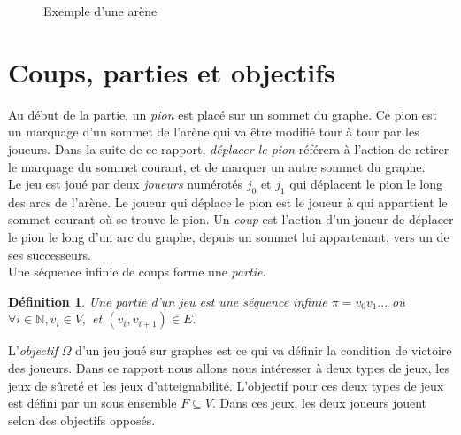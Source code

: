 \documentclass[12pt,a4paper,oneside,titlepage]{report}
\newtheorem{defi}{D\'efinition}[section]
\begin{document}
\begin{figure}[h]
\centering
{}
\caption{Exemple d'une arène}
\label{fig:arena}
\end{figure}
\section{Coups, parties et objectifs}
Au début de la partie, un \emph{pion} est placé sur un sommet du graphe. Ce pion est un marquage d'un sommet de l'arène qui va être modifié tour à tour par les joueurs. Dans la suite de ce rapport, \emph{déplacer le pion} référera à l'action de retirer le marquage du sommet courant, et de marquer un autre sommet du graphe.\\
Le jeu est joué par deux \emph{joueurs} numérotés $j_0$ et $j_1$ qui déplacent le pion le long des arcs de l'arène. Le joueur qui déplace le pion est le joueur à qui appartient le sommet courant où se trouve le pion. Un \emph{coup} est l'action d'un joueur de déplacer le pion le long d'un arc du graphe, depuis un sommet lui appartenant, vers un de ses successeurs.\\
Une séquence infinie de coups forme une \emph{partie}.
\begin{defi}
	Une \emph{partie} d'un jeu est une séquence infinie $\pi=v_0 v_1 ...$ où $\forall i\in \mathbb{N},v_i \in V, $ et $(v_i, v_{i+1})\in E$.
\end{defi}
\noindent L'\emph{objectif} $\Omega$ d'un jeu joué sur graphes est ce qui va définir la condition de victoire des joueurs. Dans ce rapport nous allons nous intéresser à deux types de jeux, les jeux de sûreté et les jeux d'atteignabilité. L'objectif pour ces deux types de jeux est défini par un sous ensemble $F\subseteq V$. Dans ces jeux, les deux joueurs jouent selon des objectifs opposés.
\end{document}

